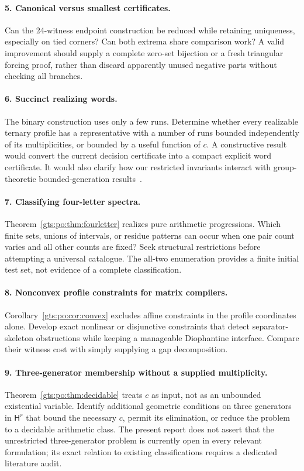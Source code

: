 \documentclass[11pt,letterpaper]{article}
\theoremstyle{definition}
\theoremstyle{remark}
\newcommand{\HH}{\mathsf H}
\begin{document}
\paragraph{5. Canonical versus smallest certificates.}
Can the 24-witness endpoint construction be reduced while retaining uniqueness, especially on tied corners? Can both extrema share comparison work? A valid improvement should supply a complete zero-set bijection or a fresh triangular forcing proof, rather than discard apparently unused negative parts without checking all branches.

\paragraph{6. Succinct realizing words.}
The binary construction uses only a few runs. Determine whether every realizable ternary profile has a representative with a number of runs bounded independently of its multiplicities, or bounded by a useful function of $c$. A constructive result would convert the current decision certificate into a compact explicit word certificate. It would also clarify how our restricted invariants interact with group-theoretic bounded-generation results~\cite{po-shafrir}.

\paragraph{7. Classifying four-letter spectra.}
Theorem~\ref{gts:po:thm:fourletter} realizes pure arithmetic progressions. Which finite sets, unions of intervals, or residue patterns can occur when one pair count varies and all other counts are fixed? Seek structural restrictions before attempting a universal catalogue. The all-two enumeration provides a finite initial test set, not evidence of a complete classification.

\paragraph{8. Nonconvex profile constraints for matrix compilers.}
Corollary~\ref{gts:po:cor:convex} excludes affine constraints in the profile coordinates alone. Develop exact nonlinear or disjunctive constraints that detect separator-skeleton obstructions while keeping a manageable Diophantine interface. Compare their witness cost with simply supplying a gap decomposition.

\paragraph{9. Three-generator membership without a supplied multiplicity.}
Theorem~\ref{gts:po:thm:decidable} treats $c$ as input, not as an unbounded existential variable. Identify additional geometric conditions on three generators in $\HH^r$ that bound the necessary $c$, permit its elimination, or reduce the problem to a decidable arithmetic class. The present report does not assert that the unrestricted three-generator problem is currently open in every relevant formulation; its exact relation to existing classifications requires a dedicated literature audit.
\end{document}
